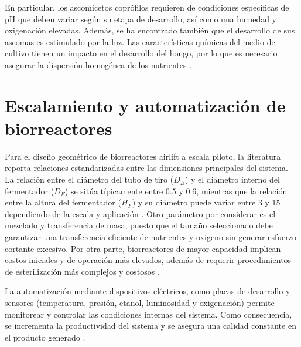 En particular, los ascomicetos coprófilos requieren de condiciones específicas de
pH que deben variar según su etapa de desarrollo, así como una humedad y
oxigenación elevadas. Además, se ha encontrado también que el desarrollo de sus
ascomas es estimulado por la luz. Las características químicas del medio de cultivo
tienen un impacto en el desarrollo del hongo, por lo que es necesario asegurar la
dispersión homogénea de los nutrientes \cite{Bills2013,Gomes2023}.

\section{Escalamiento y automatización de biorreactores}
Para el diseño geométrico de biorreactores airlift a escala piloto, la literatura
reporta relaciones estandarizadas entre las dimensiones principales del sistema.
La relación entre el diámetro del tubo de tiro ($D_B$) y el diámetro interno del
fermentador ($D_F$) se sitúa típicamente entre 0.5 y 0.6, mientras que la relación
entre la altura del fermentador ($H_F$) y su diámetro puede variar entre 3 y 15
dependiendo de la escala y aplicación \cite{Moresi2025}. 
Otro parámetro por considerar es el mezclado y transferencia de masa, puesto que
el tamaño seleccionado debe garantizar una transferencia eficiente de nutrientes y
oxigeno sin generar esfuerzo cortante excesivo. Por otra parte, biorreactores de
mayor capacidad implican costos iniciales y de operación más elevados, además
de requerir procedimientos de esterilización más complejos y costosos \cite{Moresi2025,Micheletti2006}.

La automatización mediante dispositivos eléctricos, como placas de desarrollo y
sensores (temperatura, presión, etanol, luminosidad y oxigenación) permite
monitorear y controlar las condiciones internas del sistema. Como consecuencia,
se incrementa la productividad del sistema y se asegura una calidad constante en
el producto generado \cite{Paredes2024}.
